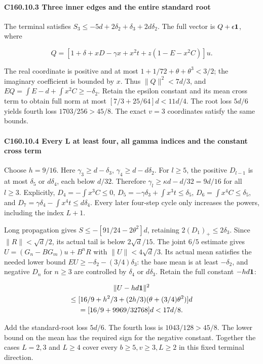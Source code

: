 \paragraph{C160.10.3 Three inner edges and the entire standard root}

The terminal satisfies \(S_3\le-5d+2\delta_2+\delta_3+2d\delta_2\). The full vector is \(Q+\epsilon\mathbf1\), where

\[
Q=[1+\delta+xD-\gamma x+x^2t+z(1-E-x^2C)]u.
\]

The real coordinate is positive and at most \(1+1/72+\theta+\theta^3<3/2\); the imaginary coefficient is bounded by \(x\). Thus \(\|Q\|^2<7d/3\), and \(EQ=\int E-d+\int x^2C\ge-\delta_2\). Retain the epsilon constant and its mean cross term to obtain full norm at most \([7/3+25/64]d<11d/4\). The root loss \(5d/6\) yields fourth loss \(1703/256>45/8\). The exact \(v=3\) coordinates satisfy the same bounds.

\paragraph{C160.10.4 Every L at least four, all gamma indices and the constant cross term}

Choose \(h=9/16\). Here \(\gamma_3\ge d-\delta_3\), \(\gamma_4\ge d-d\delta_2\). For \(l\ge5\), the positive \(D_{l-1}\) is at most \(\delta_5\) or \(d\delta_4\), each below \(d/32\). Therefore \(\gamma_l\ge\kappa d-d/32=9d/16\) for all \(l\ge3\). Explicitly, \(D_4=-\int x^3C\le0\), \(D_5=-\gamma \delta_3+\int x^3t\le \delta_5\), \(D_6=\int x^4C\le \delta_5\), and \(D_7=\gamma \delta_4-\int x^4t\le d\delta_4\). Every later four-step cycle only increases the powers, including the index \(L+1\).

Long propagation gives \(S\le-[91/24-2\theta^2]d\), retaining \(2(D_1)_+\le2\delta_3\). Since \(\|R\|<\sqrt d/2\), its actual tail is below \(2\sqrt d/15\). The joint \(6/5\) estimate gives \(U=(G_n-BG_m)u+B^nR\) with \(\|U\|<4\sqrt d/3\). Its actual mean satisfies the needed lower bound \(EU\ge-\delta_2-(3/4)\delta_3\): the base mean is at least \(-\delta_2\), and negative \(D_n\) for \(n\ge3\) are controlled by \(\delta_4\) or \(d\delta_3\). Retain the full constant \(-hd\mathbf1\):

\[
\begin{gathered}
\|U-hd\mathbf1\|^2\\
\le[16/9+h^2/3+(2h/3)(\theta+(3/4)\theta^2)]d\\
=[16/9+9969/32768]d<17d/8.
\end{gathered}
\]

Add the standard-root loss \(5d/6\). The fourth loss is \(1043/128>45/8\). The lower bound on the mean has the required sign for the negative constant. Together the cases \(L=2,\allowbreak \allowbreak  3\) and \(L\ge4\) cover every \(b\ge5,\allowbreak \allowbreak  v\ge3,\allowbreak \allowbreak  L\ge2\) in this fixed terminal direction.
